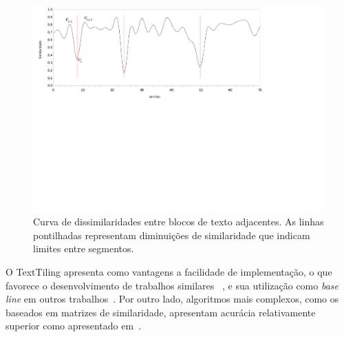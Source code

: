    
\begin{figure}[h!]
\center
	\includegraphics[trim={ 10 320 180 0 },clip,page=1,width=\textwidth]{conteudo/capitulos/figs/curva-similaridade.pdf}

	\caption{Curva de dissimilaridades entre blocos de texto adjacentes. As linhas pontilhadas representam diminuições de similaridade que indicam limites entre segmentos.}
	\label{fig:curvasimilaridade}
\end{figure}



O TextTiling apresenta como vantagens a facilidade de implementação, 
o que favorece o desenvolvimento de trabalhos similares 
~\cite{Naili2016,bokaei2015a,CHAIBI2014,Kern2009,Galley2003}, 
e sua utilização como \textit{base line} em outros trabalhos~\cite{Cardoso2017,Dias2007}. Por outro lado, algoritmos mais complexos, como os baseados em matrizes de similaridade, apresentam acurácia relativamente superior como apresentado em~\cite{Choic99, Kern2009, misra2009a}.





